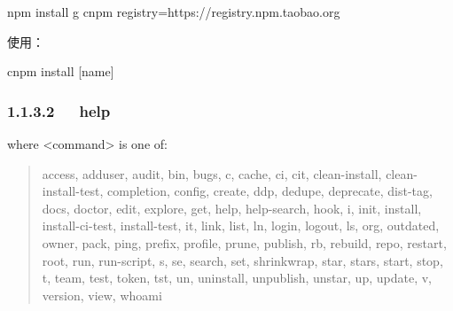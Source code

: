 \documentclass[letterpaper,12pt,english]{sphinxmanual}
\begin{document}
\begin{sphinxVerbatim}[commandchars=\\\{\}]
\PYGZdl{} npm install \PYGZhy{}g cnpm \PYGZhy{}\PYGZhy{}registry=https://registry.npm.taobao.org
\end{sphinxVerbatim}

使用：

\begin{sphinxVerbatim}[commandchars=\\\{\}]
\PYGZdl{} cnpm install [name]
\end{sphinxVerbatim}


\subsubsection{1.1.3.2   help}
\label{\detokenize{001software/001install/001._u7f51_u7ad9/nodeJs:help}}
where \textless{}command\textgreater{} is one of:
\begin{quote}

access, adduser, audit, bin, bugs, c, cache, ci, cit,
clean-install, clean-install-test, completion, config,
create, ddp, dedupe, deprecate, dist-tag, docs, doctor,
edit, explore, get, help, help-search, hook, i, init,
install, install-ci-test, install-test, it, link, list, ln,
login, logout, ls, org, outdated, owner, pack, ping, prefix,
profile, prune, publish, rb, rebuild, repo, restart, root,
run, run-script, s, se, search, set, shrinkwrap, star,
stars, start, stop, t, team, test, token, tst, un,
uninstall, unpublish, unstar, up, update, v, version, view,
whoami
\end{quote}

\begin{sphinxVerbatim}[commandchars=\\\{\}]
       
                
         
         

   
\end{sphinxVerbatim}
\end{document}
